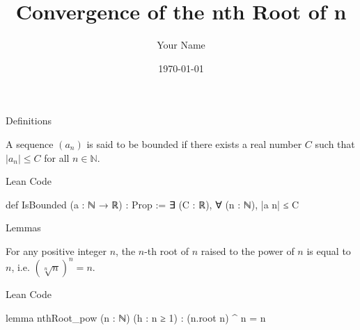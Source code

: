 \documentclass{beamer}
\title{Convergence of the nth Root of n}
\author{Your Name}
\date{\today}
\begin{document}
\begin{frame}
    \titlepage
\end{frame}

\begin{frame}[fragile]{Definitions}
    \begin{definition}
        A sequence $(a_n)$ is said to be bounded if there exists a real number $C$ such that $|a_n| \leq C$ for all $n \in \mathbb{N}$.
    \end{definition}
    \begin{block}{Lean Code}
        \begin{leancode}
        def IsBounded (a : ℕ → ℝ) : Prop :=
        ∃ (C : ℝ), ∀ (n : ℕ), |a n| ≤ C
        \end{leancode}
    \end{block}

\end{frame}

\begin{frame}[fragile]{Lemmas}
    \begin{lemma}
        For any positive integer $n$, the $n$-th root of $n$ raised to the power of $n$ is equal to $n$, i.e. $(\sqrt[n]{n})^n = n$.
    \end{lemma}

    \begin{block}{Lean Code}
    \begin{leancode}
    lemma nthRoot_pow (n : ℕ) (h : n ≥ 1) : (n.root n) ^ n = n
    \end{leancode}
    \end{block}
\end{frame}
\end{document}
